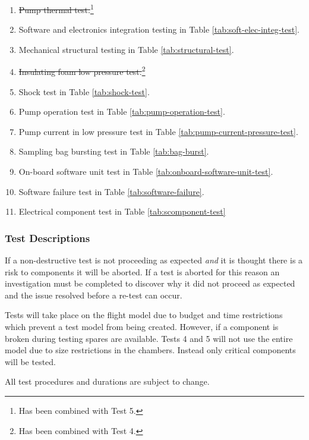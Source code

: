 \begin{enumerate}
    \item \st{Pump thermal test.}\footnote{Has been combined with Test 5.\label{fn:test-combined5}}
    \item Software and electronics integration testing in Table \ref{tab:soft-elec-integ-test}.
    \item Mechanical structural testing in Table \ref{tab:structural-test}.
    \item \st{Insulating foam low pressure test.}\footnote{Has been combined with Test 4.\label{fn:test-combined4}}
    \item Shock test in Table \ref{tab:shock-test}.
    \item Pump operation test in Table \ref{tab:pump-operation-test}.
    \item Pump current in low pressure test in Table \ref{tab:pump-current-pressure-test}.
    \item Sampling bag bursting test in Table \ref{tab:bag-burst}.
    \item On-board software unit test in Table \ref{tab:onboard-software-unit-test}.
    \item Software failure test in Table \ref{tab:software-failure}.
    \item Electrical component test in Table \ref{tab:scomponent-test}
\end{enumerate}

\subsubsection{Test Descriptions}

If a non-destructive test is not proceeding as expected \textit{and} it is thought there is a risk to components it will be aborted. If a test is aborted for this reason an investigation must be completed to discover why it did not proceed as expected and the issue resolved before a re-test can occur.

Tests will take place on the flight model due to budget and time restrictions which prevent a test model from being created. However, if a component is broken during testing spares are available. Tests 4 and 5 will not use the entire model due to size restrictions in the chambers. Instead only critical components will be tested.

All test procedures and durations are subject to change.

